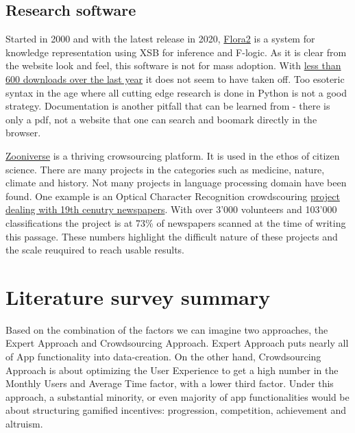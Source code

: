 \documentclass{report}
\begin{document}
\subsection{Research software}

Started in 2000 and with the latest release in 2020,
\href{https://flora.sourceforge.net/}{Flora2} is a system for knowledge representation using XSB for inference and F-logic.
As it is clear from the website look and feel, this software is not for mass adoption.
With \href{https://sourceforge.net/projects/flora/files/stats/timeline?dates=2021-12-04\%20to\%202022-12-03&period=daily}{less than 600 downloads over the last year} it does not seem to have taken off.
Too esoteric syntax in the age where all cutting edge research is done in Python is not a good strategy. Documentation is another pitfall that can be learned from - there is only a pdf, not a website that one can search and boomark directly in the browser. 

\href{https://www.zooniverse.org/projects}{Zooniverse} is a thriving crowsourcing platform. It is used in the ethos of citizen science. There are many projects in the categories such as medicine, nature, climate and history.  Not many projects in language processing domain have been found. One example is an Optical Character Recognition crowdscouring \href{https://www.zooniverse.org/projects/bldigital/living-with-machines}{project dealing with 19th cenutry newspapers}. With over 3'000 volunteers and 103'000 classifications the project is at 73\% of newspapers scanned at the time of writing this passage.
These numbers highlight the difficult nature of these projects and the scale reuquired to reach usable results.

\newpage

\section{Literature survey summary}

Based on the combination of the factors we can imagine two approaches, the Expert Approach and Crowdsourcing Approach.  Expert Approach puts nearly all of App functionality into data-creation. 
On the other hand, Crowdsourcing Approach is about optimizing the User Experience to get a high number in the Monthly Users and Average Time factor, with a lower third factor.  Under this approach, a substantial minority, or even majority of app functionalities would be about structuring gamified incentives: progression, competition, achievement and altruism.
\end{document}
